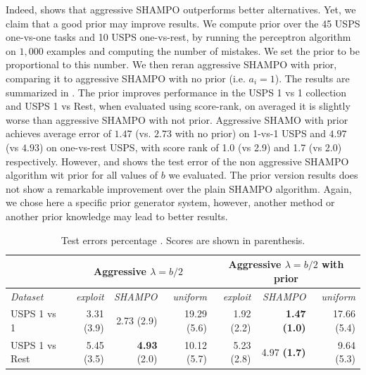 Indeed,  shows that aggressive SHAMPO outperforms better alternatives. Yet, we claim that a 
good prior may improve results. We compute prior over the 45 USPS one-vs-one tasks and 10 
USPS one-vs-rest, by running the perceptron algorithm on $1,000$ examples and computing the number of mistakes.  
We set the prior to be proportional to this number. We then reran aggressive SHAMPO with prior, 
comparing it to aggressive SHAMPO with no prior (i.e. $a_i=1$). 
The results are summarized in . The prior improves performance in the USPS 1 vs 1 
collection and USPS 1 vs Rest, when evaluated using score-rank, on averaged it is slightly worse than 
aggressive SHAMPO with not prior.
Aggressive SHAMO with prior achieves average error of $1.47$ (vs. $2.73$ with no prior) on 1-vs-1 USPS 
and $4.97$ (vs $4.93$) on one-vs-rest USPS, with score rank of 1.0 (vs 2.9) and 1.7 (vs 2.0) respectively.
However,   and  shows the test error of the non aggressive SHAMPO 
algorithm wit prior for all values of $b$ we evaluated. The prior version results does not show a remarkable 
improvement over the plain SHAMPO algorithm. Again, we chose here a specific prior generator system, 
however, another method or another prior knowledge may lead to better results.

 \begin{table}[h]
   \begin{centering}
 \caption{Test errors percentage . Scores are shown in parenthesis.}
 \label{tab:table2}
 {\scriptsize	
 \begin{tabular}{|l|r|r|r|r|r|r|}
 \hline
                         & \multicolumn{3}{c|}{\textbf{Aggressive $\lambda=b/2$}}           & \multicolumn{3}{c|}{\textbf{Aggressive $\lambda=b/2$ with prior}}  \\ \hline
 \textit{Dataset}        & \textit{exploit} & \textit{SHAMPO}     & \textit{uniform} & \textit{exploit} & \textit{SHAMPO}        & \textit{uniform} \\ \hline
 {USPS 1 vs 1}     & 3.31 (3.9)       & 2.73 (2.9)        & 19.29 (5.6)      & 1.92 (2.2)       & \textbf{1.47 (1.0)}    & 17.66 (5.4)      \\
 {USPS 1 vs Rest} & 5.45 (3.5)       & \textbf{4.93 }(2.0) & 10.12 (5.7)     & 5.23 (2.8)      & 4.97 \textbf{(1.7)} & 9.64 (5.3)      \\ \hline
 \end{tabular}
 }
 \end{centering}
 \end{table}
 
